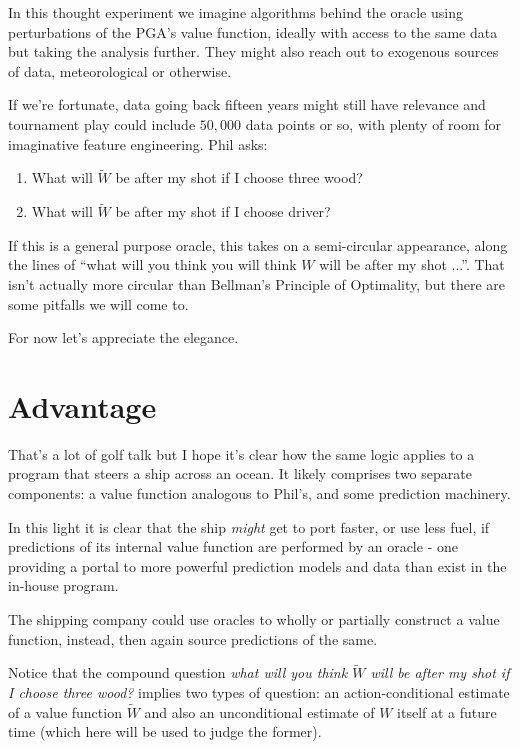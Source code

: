 In this thought experiment we imagine algorithms behind the oracle using perturbations of the PGA's value function, ideally with access to the same data but taking the analysis further. They might also reach out to exogenous sources of data, meteorological or otherwise. 

If we're fortunate, data going back fifteen years might still have relevance and tournament play could include $50,000$ data points or so, with plenty of room for imaginative feature engineering. Phil asks:

\begin{enumerate}
    \item What will $\tilde{W}$ be after my shot if I choose three wood?
    \item What will $\tilde{W}$ be after my shot if I choose driver? 
\end{enumerate}
If this is a general purpose oracle, this takes on a semi-circular appearance, along the lines of ``what will you think you will think $W$ will be after my shot ...''. That isn't actually more circular than Bellman's Principle of Optimality, but there are some pitfalls we will come to. 

For now let's appreciate the elegance. 



\section{Advantage}
\label{sec:advantage}

That's a lot of golf talk but I hope it's clear how the same logic applies to a program that steers a ship across an ocean. It likely comprises two separate components: a value function analogous to Phil's, and some prediction machinery. 

In this light it is clear that the ship {\em might} get to port faster, or use less fuel, if predictions of its internal value function are performed by an oracle - one providing a portal to more powerful prediction models and data than exist in the in-house program. 

The shipping company could use oracles to wholly or partially construct a value function, instead, then again source predictions of the same. 

Notice that the compound question {\em what will you think $\tilde{W}$ will be after my shot if I choose three wood?} implies two types of question: an action-conditional estimate of a value function $\tilde{W}$ and also an unconditional estimate of $W$ itself at a future time (which here will be used to judge the former).  

